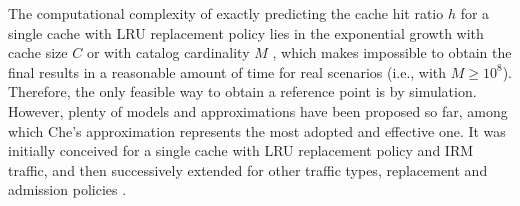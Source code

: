 \documentclass[10pt]{article}
\newcommand{\fakeacmpar}[1]{\vspace{2 mm}\noindent{\textbf{#1.}}}
\begin{document}
\fakeacmpar{LRU}
The computational complexity of exactly predicting the cache hit ratio $h$ for a single cache with LRU replacement policy lies in the exponential growth with cache size $C$ or with catalog cardinality $M$ \cite{King:71}, which makes impossible to obtain the final results in a reasonable amount of time for real scenarios (i.e., with $M \ge 10^8$).
Therefore, the only feasible way to obtain a reference point is by simulation. 
However, plenty of models and approximations have been proposed so far, among which Che's approximation \cite{wang02jsac_hierarchical} represents the most adopted and effective one. It was initially conceived for a single cache with LRU replacement policy and IRM traffic, and then successively extended for other traffic types, replacement and admission policies \cite{martina14infocom}.
\end{document}
